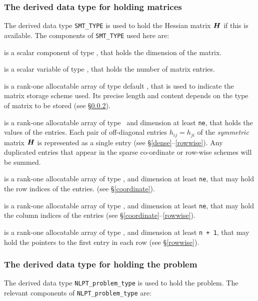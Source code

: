 \documentclass{galahad}
\begin{document}
\subsubsection{The derived data type for holding matrices}\label{typesmt}
The derived data type {\tt SMT\_TYPE} is used to hold the Hessian matrix ${\bm{H}}$
if this is available. The components of {\tt SMT\_TYPE} used here are:

\begin{description}

 is a scalar component of type \integer,
that holds the dimension of the matrix.

 is a scalar variable of type \integer, that
holds the number of matrix entries.

 is a rank-one allocatable array of type default \character, that
is used to indicate the matrix storage scheme used. Its precise length and
content depends on the type of matrix to be stored (see \S\ref{typeprob}).

 is a rank-one allocatable array of type \realdp\,
and dimension at least {\tt ne}, that holds the values of the entries.
Each pair of off-diagonal entries $h_{ij} = h_{ji}$ of the {\em symmetric}
matrix ${\bm{H}}$ is represented as a single entry
(see \S\ref{dense}--\ref{rowwise}).
Any duplicated entries that appear in the sparse
co-ordinate or row-wise schemes will be summed.

 is a rank-one allocatable array of type \integer,
and dimension at least {\tt ne}, that may hold the row indices of the entries.
(see \S\ref{coordinate}).

 is a rank-one allocatable array of type \integer,
and dimension at least {\tt ne}, that may hold the column indices of the entries
(see \S\ref{coordinate}--\ref{rowwise}).

 is a rank-one allocatable array of type \integer,
and dimension at least {\tt n + 1}, that may hold the pointers to
the first entry in each row (see \S\ref{rowwise}).

\end{description}


\subsubsection{The derived data type for holding the problem}\label{typeprob}
The derived data type {\tt NLPT\_problem\_type} is used to hold
the problem. The relevant components of
{\tt NLPT\_problem\_type}
are:
\end{document}
